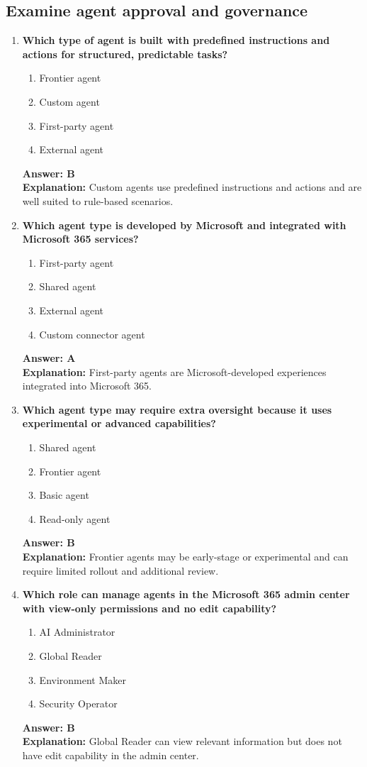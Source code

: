\documentclass[10pt]{article}
\begin{document}
\subsection{Examine agent approval and governance}
\begin{enumerate}[leftmargin=*]

\item \textbf{Which type of agent is built with predefined instructions and actions for structured, predictable tasks?}
\begin{enumerate}[label=\Alph*.]
  \item Frontier agent
  \item Custom agent
  \item First-party agent
  \item External agent
\end{enumerate}
\textbf{Answer: B}\\
\textbf{Explanation:} Custom agents use predefined instructions and actions and are well suited to rule-based scenarios.

\item \textbf{Which agent type is developed by Microsoft and integrated with Microsoft 365 services?}
\begin{enumerate}[label=\Alph*.]
  \item First-party agent
  \item Shared agent
  \item External agent
  \item Custom connector agent
\end{enumerate}
\textbf{Answer: A}\\
\textbf{Explanation:} First-party agents are Microsoft-developed experiences integrated into Microsoft 365.

\item \textbf{Which agent type may require extra oversight because it uses experimental or advanced capabilities?}
\begin{enumerate}[label=\Alph*.]
  \item Shared agent
  \item Frontier agent
  \item Basic agent
  \item Read-only agent
\end{enumerate}
\textbf{Answer: B}\\
\textbf{Explanation:} Frontier agents may be early-stage or experimental and can require limited rollout and additional review.

\item \textbf{Which role can manage agents in the Microsoft 365 admin center with view-only permissions and no edit capability?}
\begin{enumerate}[label=\Alph*.]
  \item AI Administrator
  \item Global Reader
  \item Environment Maker
  \item Security Operator
\end{enumerate}
\textbf{Answer: B}\\
\textbf{Explanation:} Global Reader can view relevant information but does not have edit capability in the admin center.


\end{enumerate}
\end{document}
